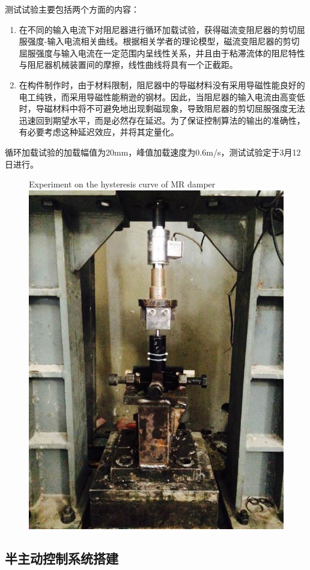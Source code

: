 测试试验主要包括两个方面的内容：

\begin{enumerate}
	\item 在不同的输入电流下对阻尼器进行循环加载试验，获得磁流变阻尼器的剪切屈服强度-输入电流相关曲线。根据相关学者的理论模型，磁流变阻尼器的剪切屈服强度与输入电流在一定范围内呈线性关系，并且由于粘滞流体的阻尼特性与阻尼器机械装置间的摩擦，线性曲线将具有一个正截距。
	
	\item 在构件制作时，由于材料限制，阻尼器中的导磁材料没有采用导磁性能良好的电工纯铁，而采用导磁性能稍逊的钢材。因此，当阻尼器的输入电流由高变低时，导磁材料中将不可避免地出现剩磁现象，导致阻尼器的剪切屈服强度无法迅速回到期望水平，而是必然存在延迟。为了保证控制算法的输出的准确性，有必要考虑这种延迟效应，并将其定量化。
\end{enumerate}

循环加载试验的加载幅值为20mm，峰值加载速度为0.6m/s，测试试验定于3月12日进行。



\begin{figure}[H]
	\centering
		{Experiment on the hysteresis curve of MR damper}
	\label{shiyan}
	\includegraphics[width=.5\linewidth]{figure/shiyan}
\end{figure}








\subsection{半主动控制系统搭建}

